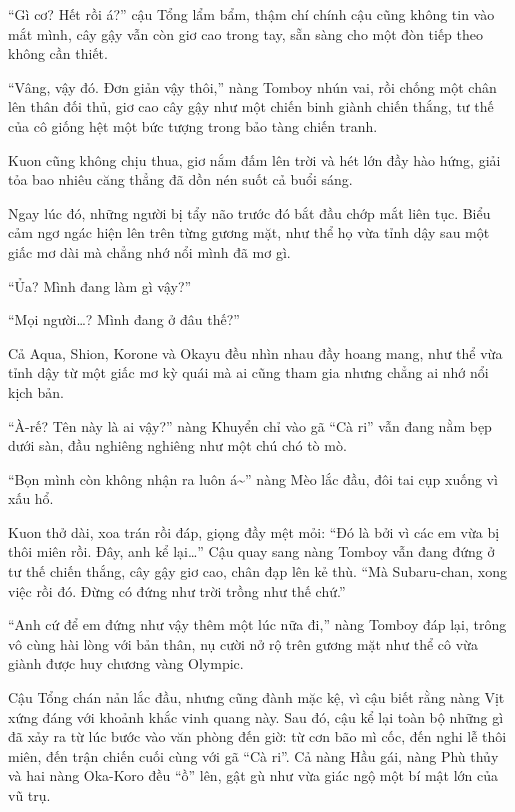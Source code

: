 \documentclass[../main.tex]{subfiles}
\begin{document}

``Gì cơ? Hết rồi á?'' cậu Tổng lẩm bẩm, thậm chí chính cậu cũng không tin vào mắt mình, cây gậy vẫn còn giơ cao trong tay, sẵn sàng cho một đòn tiếp theo không cần thiết.

``Vâng, vậy đó. Đơn giản vậy thôi,'' nàng Tomboy nhún vai, rồi chống một chân lên thân đối thủ, giơ cao cây gậy như một chiến binh giành chiến thắng, tư thế của cô giống hệt một bức tượng trong bảo tàng chiến tranh.

Kuon cũng không chịu thua, giơ nắm đấm lên trời và hét lớn đầy hào hứng, giải tỏa bao nhiêu căng thẳng đã dồn nén suốt cả buổi sáng.

Ngay lúc đó, những người bị tẩy não trước đó bắt đầu chớp mắt liên tục. Biểu cảm ngơ ngác hiện lên trên từng gương mặt, như thể họ vừa tỉnh dậy sau một giấc mơ dài mà chẳng nhớ nổi mình đã mơ gì.

``Ủa? Mình đang làm gì vậy?''

``Mọi người\dots? Mình đang ở đâu thế?''

Cả Aqua, Shion, Korone và Okayu đều nhìn nhau đầy hoang mang, như thể vừa tỉnh dậy từ một giấc mơ kỳ quái mà ai cũng tham gia nhưng chẳng ai nhớ nổi kịch bản.

``À-rế? Tên này là ai vậy?'' nàng Khuyển chỉ vào gã ``Cà ri'' vẫn đang nằm bẹp dưới sàn, đầu nghiêng nghiêng như một chú chó tò mò.

``Bọn mình còn không nhận ra luôn á\~{}'' nàng Mèo lắc đầu, đôi tai cụp xuống vì xấu hổ.

Kuon thở dài, xoa trán rồi đáp, giọng đầy mệt mỏi: ``Đó là bởi vì các em vừa bị thôi miên rồi. Đây, anh kể lại\dots'' Cậu quay sang nàng Tomboy vẫn đang đứng ở tư thế chiến thắng, cây gậy giơ cao, chân đạp lên kẻ thù. ``Mà Subaru-chan, xong việc rồi đó. Đừng có đứng như trời trồng như thế chứ.''

``Anh cứ để em đứng như vậy thêm một lúc nữa đi,'' nàng Tomboy đáp lại, trông vô cùng hài lòng với bản thân, nụ cười nở rộ trên gương mặt như thể cô vừa giành được huy chương vàng Olympic.

Cậu Tổng chán nản lắc đầu, nhưng cũng đành mặc kệ, vì cậu biết rằng nàng Vịt xứng đáng với khoảnh khắc vinh quang này. Sau đó, cậu kể lại toàn bộ những gì đã xảy ra từ lúc bước vào văn phòng đến giờ: từ cơn bão mì cốc, đến nghi lễ thôi miên, đến trận chiến cuối cùng với gã ``Cà ri''. Cả nàng Hầu gái, nàng Phù thủy và hai nàng Oka-Koro đều ``ồ'' lên, gật gù như vừa giác ngộ một bí mật lớn của vũ trụ.
\end{document}
